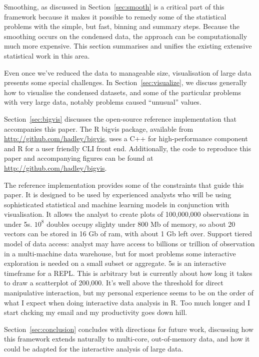 \documentclass[journal]{vgtc}                %
\begin{document}
Smoothing, as discussed in Section~\ref{sec:smooth} is a critical part of this framework because it makes it possible to remedy some of the statistical problems with the simple, but fast, binning and summary steps. Because the smoothing occurs on the condensed data, the approach can be computationally much more expensive. This section summarises and unifies the existing extensive statistical work in this area.

Even once we've reduced the data to manageable size, visualisation of large data presents some special challenges. In Section~\ref{sec:visualize}, we discuss generally how to visualise the condensed datasets, and some of the particular problems with very large data, notably problems caused ``unusual'' values.

Section~\ref{sec:bigvis} discusses the open-source reference implementation that accompanies this paper. The R \citep{R} bigvis package, available from \url{http://github.com/hadley/bigvis}, uses a C++ for high-performance component and R for a user friendly CLI front end.  Additionally, the code to reproduce this paper and accompanying figures can be found at \url{http://github.com/hadley/bigvis}.

The reference implementation provides some of the constraints that guide this paper. It is designed to be used by experienced analysts who will be using  sophisticated statistical and machine learning models in conjunction with visualisation.  It allows the analyst to create plots of 100,000,000 observations in under 5s. $10^8$ doubles occupy slighty under 800 Mb of memory, so about 20 vectors can be stored in 16 Gb of ram, with about 1 Gb left over. Support tiered model of data access: analyst may have access to billions or trillion of observation in a multi-machine data warehouse, but for most problems some interactive exploration is needed on a small subset or aggregate. 5s is an interactive timeframe for a REPL.  This is arbitrary but is currently about how long it takes to draw a scatterplot of 200,000. It's well above the threshold for direct manipulative interaction, but my personal experience seems to be on the order of what I expect when doing interactive data analysis in R.  Too much longer and I start chcking my email and my productivity goes down hill.

Section~\ref{sec:conclusion} concludes with directions for future work, discussing how this framework extends naturally to multi-core, out-of-memory data, and how it could be adapted for the interactive analysis of large data.
\end{document}
